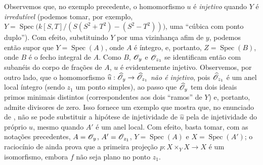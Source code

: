 \begin{env}[11.7.4]
\label{IV.11.7.4}
Observemos que, no exemplo
precedente, o homomorfismo
$u$ é \emph{injetivo} quando
$Y$ é \emph{irredutível}
(podemos tomar, por exemplo,
$Y=\operatorname{Spec}
\bigl(k[S,T]/(S(S^2+T^2)
-(S^2-T^2))\bigr)$, uma
``cúbica com ponto duplo'').
Com efeito, substituindo $Y$
por uma vizinhança afim de
$y$, podemos então supor
que $Y=\operatorname{Spec}(A)$,
onde $A$ é íntegro, e,
portanto,
$Z=\operatorname{Spec}(B)$,
onde $B$ é o fecho integral
de $A$. Como $B$, $\mathscr{O}_y$
e $\mathscr{O}_{z_1}$ se identificam
então com subanéis do corpo
de frações de $A$, $u$ é
evidentemente injetivo.
Observemos, por outro lado,
que o homomorfismo
$\widehat u:\widehat{\sh{O}}_y
\to\widehat{\sh{O}}_{z_1}$
\emph{não é injetivo}, pois
$\widehat{\mathscr{O}}_{z_1}$ é um
anel local íntegro (sendo
$z_1$ um ponto simples),
ao passo que
$\widehat{\mathscr{O}}_y$ tem dois
ideais primos minimais
distintos (correspondentes
aos dois ``ramos'' de $Y$)
e, portanto, admite divisores
de zero. Isso fornece um
exemplo que mostra que, no
enunciado de ,
não se pode substituir a
hipótese de injetividade de
$\widehat u$ pela de
injetividade do próprio $u$,
mesmo quando $A'$ é um anel
local. Com efeito, basta
tomar, com as notações
precedentes, $A=\mathscr{O}_y$,
$A'=\mathscr{O}_{z_1}$,
$Y=\operatorname{Spec}(A)$ e
$X=\operatorname{Spec}(A')$;
o raciocínio de 
ainda prova que a primeira
projeção $p:X\times_Y X\to X$
é um isomorfismo, embora $f$
não seja plano no ponto $z_1$.
\end{env}

